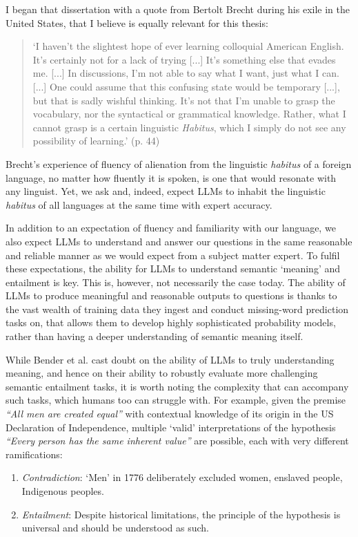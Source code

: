 \documentclass[12pt,twoside]{report}
\begin{document}
I began that dissertation with a quote from Bertolt Brecht during his exile in the United States, that I believe is equally relevant for this thesis:
\begin{quote}
    `I haven't the slightest hope of ever learning colloquial American English. It's certainly not for a lack of trying [...] It's something else that evades me. [...] In discussions, I'm not able to say what I want, just what I can. [...] One could assume that this confusing state would be temporary [...], but that is sadly wishful thinking. It's not that I'm unable to grasp the vocabulary, nor the syntactical or grammatical knowledge. Rather, what I cannot grasp is a certain linguistic \textit{Habitus}, which I simply do not see any possibility of learning.' \cite{brecht} (p. 44)
\end{quote}

Brecht's experience of fluency of alienation from the linguistic \textit{habitus} of a foreign language, no matter how fluently it is spoken, is one that would resonate with any linguist. Yet, we ask and, indeed, expect LLMs to inhabit the linguistic \textit{habitus} of all languages at the same time with expert accuracy. \newline \par

In addition to an expectation of fluency and familiarity with our language, we also expect LLMs to understand and answer our questions in the same reasonable and reliable manner as we would expect from a subject matter expert. To fulfil these expectations, the ability for LLMs to understand semantic `meaning' and entailment is key. This is, however, not necessarily the case today. The ability of LLMs to produce meaningful and reasonable outputs to questions is thanks to the vast wealth of training data they ingest and conduct missing-word prediction tasks on, that allows them to develop highly sophisticated probability models, rather than having a deeper understanding of semantic meaning itself. \cite{merrill-etal-2022-entailment} \cite{bender-koller-2020-climbing} \newline \par 
While Bender et al. cast doubt on the ability of LLMs to truly understanding meaning, and hence on their ability to robustly evaluate more challenging semantic entailment tasks, it is worth noting the complexity that can accompany such tasks, which humans too can struggle with. For example, given the premise \textit{``All men are created equal''} with contextual knowledge of its origin in the US Declaration of Independence, multiple `valid' interpretations of the hypothesis \textit{``Every person has the same inherent value''} are possible, each with very different ramifications:
\begin{enumerate}[itemsep=0pt]
    \item \textit{Contradiction}: `Men' in 1776 deliberately excluded women, enslaved people, Indigenous peoples.
    \item \textit{Entailment}: Despite historical limitations, the principle of the hypothesis is universal and should be understood as such.
\end{enumerate}
\end{document}
